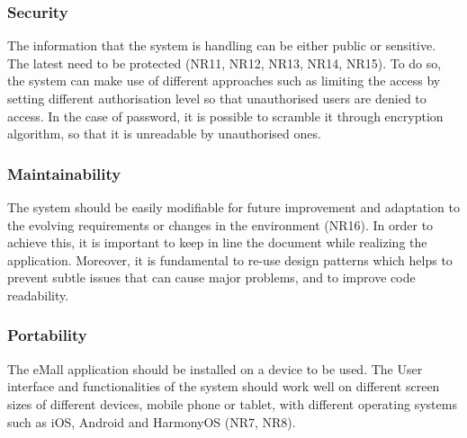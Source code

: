 \documentclass[../main.tex]{subfiles}
\begin{document}
\subsubsection{Security}
The information that the system is handling can be either public or sensitive. The latest need to be protected (NR11, NR12, NR13, NR14, NR15). To do so, the system can make use of different approaches such as limiting the access by setting different authorisation level so that unauthorised users are denied to access. In the case of password, it is possible to scramble it through encryption algorithm, so that it is unreadable by unauthorised ones.

\subsubsection{Maintainability}
The system should be easily modifiable for future improvement and adaptation to the evolving requirements or changes in the environment (NR16). In order to achieve this, it is important to keep in line the document while realizing the application. Moreover, it is fundamental to re-use design patterns which helps to prevent subtle issues that can cause major problems, and to improve code readability.


\subsubsection{Portability}
The eMall application should be installed on a device to be used. The User interface and functionalities of the system should work well on different screen sizes of different devices, mobile phone or tablet, with different operating systems such as iOS, Android and HarmonyOS (NR7, NR8).


\end{document}

